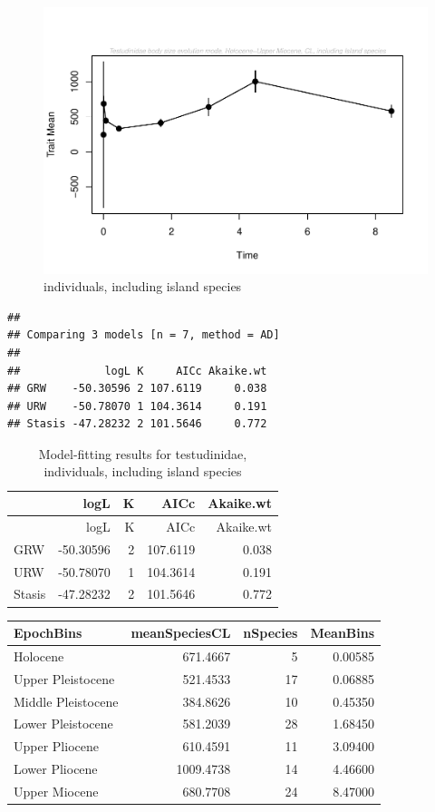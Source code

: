 \documentclass[]{article}
\begin{document}
\begin{figure}[htbp]
\centering
\includegraphics{MA_JJ_files/figure-latex/paleoTS plot-1.pdf}
\caption{individuals, including island species}
\end{figure}

\begin{verbatim}
## 
## Comparing 3 models [n = 7, method = AD]
## 
##             logL K     AICc Akaike.wt
## GRW    -50.30596 2 107.6119     0.038
## URW    -50.78070 1 104.3614     0.191
## Stasis -47.28232 2 101.5646     0.772
\end{verbatim}

\begin{longtable}[]{@{}lrrrr@{}}
\caption{Model-fitting results for testudinidae, individuals, including
island species}\tabularnewline
\toprule
& logL & K & AICc & Akaike.wt\tabularnewline
\midrule
\endfirsthead
\toprule
& logL & K & AICc & Akaike.wt\tabularnewline
\midrule
\endhead
GRW & -50.30596 & 2 & 107.6119 & 0.038\tabularnewline
URW & -50.78070 & 1 & 104.3614 & 0.191\tabularnewline
Stasis & -47.28232 & 2 & 101.5646 & 0.772\tabularnewline
\bottomrule
\end{longtable}

\begin{longtable}[]{@{}lrrr@{}}
\toprule
EpochBins & meanSpeciesCL & nSpecies & MeanBins\tabularnewline
\midrule
\endhead
Holocene & 671.4667 & 5 & 0.00585\tabularnewline
Upper Pleistocene & 521.4533 & 17 & 0.06885\tabularnewline
Middle Pleistocene & 384.8626 & 10 & 0.45350\tabularnewline
Lower Pleistocene & 581.2039 & 28 & 1.68450\tabularnewline
Upper Pliocene & 610.4591 & 11 & 3.09400\tabularnewline
Lower Pliocene & 1009.4738 & 14 & 4.46600\tabularnewline
Upper Miocene & 680.7708 & 24 & 8.47000\tabularnewline
\bottomrule
\end{longtable}
\end{document}
